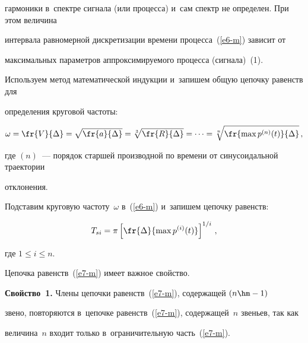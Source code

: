 гармоники в~спектре сигнала (или процесса) и~сам спектр не определен. При этом величина 


интервала равномерной дискретизации времени процесса~(\ref{e6-m}) зависит от 


максимальных параметров аппроксимируемого процесса (сигнала)~(1).


  


  Используем метод математической индукции и~запишем общую цепочку равенств для 


определения круговой частоты: 


  $$


  \omega=\fr{V}{\Delta} =\sqrt{\fr{a}{\Delta}} =


  \sqrt[3]{\fr{R}{\Delta}}=\cdots = \sqrt[n]{\fr{\max 


p^{(n)} (t)}{\Delta}}\,,


  $$


  где $(n)$~--- порядок старшей производной по времени от синусоидальной траектории 


отклонения.


  


  Подставим круговую частоту~$\omega$ в~(\ref{e6-m}) и~запишем цепочку равенств:


  \begin{equation}


  T_{si}= \pi \left[ \fr{\Delta}{\max p^{(i)}(t)}\right]^{1/i}\,,


  \label{e7-m}


  \end{equation}


где $1\leq i\leq n$.





  Цепочка равенств~(\ref{e7-m}) имеет важное свойство.


  


  \smallskip


  


  \noindent


  \textbf{Свойство~1.} Члены цепочки равенств~(\ref{e7-m}), содержащей $(n\hm-1)$ 


звено, повторяются в~цепочке равенств~(\ref{e7-m}), содержащей~$n$ звеньев, так как 


величина~$n$ входит только в~ограничительную часть~(\ref{e7-m}).


